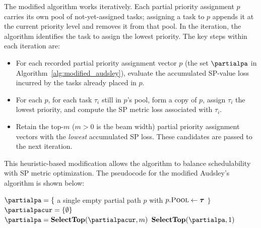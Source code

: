     The modified algorithm works iteratively.
    Each partial priority assignment $p$ carries its own pool of not-yet-assigned tasks; assigning a task to $p$ appends it at the current priority level and removes it from that pool.
    In the  iteration, the algorithm identifies the task to assign the  lowest priority.
    The key steps within each iteration are:
\begin{itemize}
    \item For each recorded partial priority assignment vector $p$ (the set $\partialpa$ in Algorithm~\ref{alg:modified_audsley}), evaluate the accumulated SP-value loss incurred by the tasks already placed in $p$.
    \item For each $p$, for each task $\tau_i$ still in $p$'s pool, form a copy of $p$, assign $\tau_i$ the  lowest priority, and compute the SP metric loss associated with $\tau_i$.
    \item Retain the top-$m$ ($m>0$ is the beam width) partial priority assignment vectors with the \emph{lowest} accumulated SP loss.
    These candidates are passed to the next iteration.
\end{itemize}

This heuristic-based modification allows the algorithm to balance schedulability with SP metric optimization.
The pseudocode for the modified Audsley's algorithm is shown below:

	\begin{algorithm}[htbp]
		\caption{Modified Audsley's Algorithm} \label{alg:modified_audsley}
		$\partialpa = \{$ a single empty partial path $p$ with $p.\textsc{Pool} \leftarrow \boldsymbol{\tau}$ $\}$ 
		{
			$\partialpacur=\{\emptyset\}$\\
			$\partialpa = \textbf{SelectTop}(\partialpacur, m)$ 
		}
		\KwRet $\textbf{SelectTop}(\partialpa, 1)$
	\end{algorithm}

